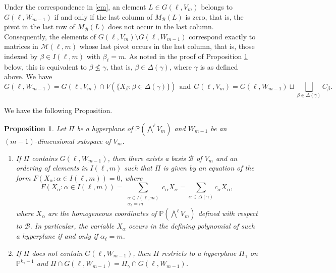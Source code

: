 \documentclass[10pt,a4paper,oneside]{amsproc}
\newtheorem{proposition}[theorem]{Proposition}
\newcommand{\B}{\mathcal{B}}
\def\a{{\alpha}}
\def\PP{{\mathbb P}}
\begin{document}
Under the correspondence in \eqref{em}, an element $L \in G(\ell, V_m)$  belongs to $G(\ell, W_{m-1})$ if and only if the last column of  $M_{\mathcal{B}}(L)$ is zero, that is, the pivot in the last row of $M_{\mathcal{B}}(L)$ does not occur in the last column. Consequently, the elements of $G(\ell, V_m) \setminus G(\ell, W_{m-1})$ correspond exactly to matrices in $\mathcal{M}(\ell, m)$ whose last pivot occurs  in the last column, that is, those indexed by $\beta \in I(\ell, m)$ with $\beta_\ell = m$. As noted in the proof of Proposition \ref{prop:glm-1} below, this is equivalent to $\beta \not\leq \gamma$, 
that is, $\beta \in \Delta(\gamma)$, where $\gamma$ is as defined above. We have  
\begin{equation}\label{glm-1}
 G(\ell, W_{m-1}) = G(\ell, V_m) \cap V(\{X_{\beta} : \beta \in \Delta (\gamma)\}) \ \ \text{and} \ \    G(\ell, V_m) = G(\ell, W_{m-1}) \sqcup \bigsqcup_{\beta \in \Delta (\gamma)} C_\beta.
\end{equation}

We have the following Proposition. 

\begin{proposition}\label{prop:glm-1}
    Let $\Pi$ be a hyperplane of $\PP\left(\bigwedge^\ell V_{m} \right)$ and $W_{m-1}$ be an $(m-1)$-dimensional subspace of $V_m$. 
    \begin{enumerate}
        \item[(a)]  If $\Pi$ contains $G(\ell, W_{m-1})$, then there exists a basis $\B$ of $V_m$ and an ordering of elements in $I(\ell, m)$ such that $\Pi$ is given by an equation of the form $F(X_\a : \a \in I(\ell, m)) = 0$, where
        $$F(X_\a : \a \in I(\ell, m)) = \sum_{\substack{\a \in I(\ell, m) \\ \a_\ell = m}} c_\a X_\a = \sum_{\a \in \Delta (\gamma)} c_\a X_\a,$$ where $X_\a$ are the homogeneous coordinates of $\PP \left( \bigwedge^{\ell} V_m \right)$  defined with respect to $\B$. In particular, the variable $X_\a$ occurs in the defining polynomial of such a hyperplane if and only if $\a_\ell = m$.
        \item[(b)]  If $\Pi$ does not contain $G(\ell, W_{m-1})$, then $\Pi$ restricts to a hyperplane $\Pi_\gamma$ on $\PP^{k_\gamma - 1}$ and $\Pi \cap G(\ell, W_{m-1}) = \Pi_\gamma \cap G(\ell, W_{m-1})$. 
    \end{enumerate}
   \end{proposition}
\end{document}
